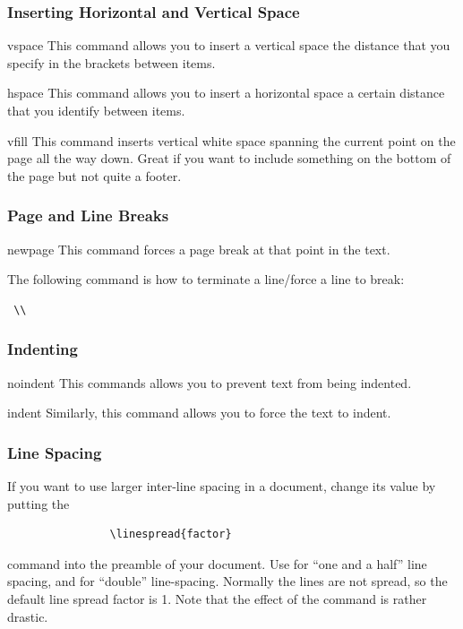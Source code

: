 \documentclass[12pt,hidelinks]{article}
\begin{document}
		\subsubsection{Inserting Horizontal and Vertical Space}
			\begin{docCommand}{vspace}{}
				This command allows you to insert a vertical space the distance that you specify in the brackets between items.
			\end{docCommand}
			\begin{docCommand}{hspace}{}
				This command allows you to insert a horizontal space a certain distance that you identify between items.
			\end{docCommand}
			\begin{docCommand}{vfill}{}
				This command inserts vertical white space spanning the current point on the page all the way down. Great if you want to include something on the bottom of the page but not quite a footer. 
			\end{docCommand}
		\subsubsection{Page and Line Breaks}\label{subsec:linebreaking}
			\begin{docCommand}{newpage}{}
				This command forces a page break at that point in the text. 
			\end{docCommand}
		The following command is how to terminate a line/force a line to break:
			\begin{verbatim} \\ \end{verbatim}
		\subsubsection{Indenting}
			\begin{docCommand}{noindent}{}
				This commands allows you to prevent text from being indented.
			\end{docCommand}
			\begin{docCommand}{indent}{}
				Similarly, this command allows you to force the text to indent.
			\end{docCommand}
		\subsubsection{Line Spacing}
			If you want to use larger inter-line spacing in a document, change its value by putting the
			\begin{verbatim}
				\linespread{factor}
			\end{verbatim}
			command into the preamble of your document. Use  for “one and a half” line spacing, and  for “double” line-spacing. Normally the lines are not spread, so the default line spread factor is 1.
			Note that the effect of the  command is rather drastic.
\end{document}
